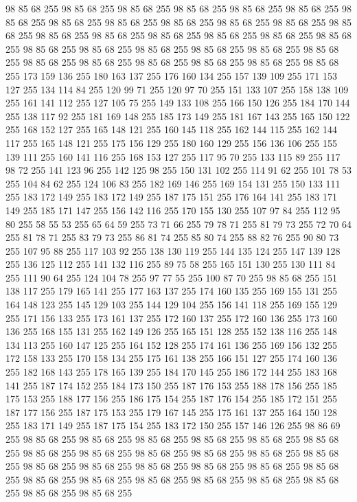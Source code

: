 98 85 68 255 98 85 68 255 98 85 68 255 98 85 68 255 98 85 68 255 98 85 68 255 98 85 68 255 98 85 68 255 98 85 68 255 98 85 68 255 98 85 68 255 98 85 68 255 98 85 68 255 98 85 68 255 98 85 68 255 98 85 68 255 98 85 68 255 98 85 68 255 98 85 68 255 98 85 68 255 98 85 68 255 98 85 68 255 98 85 68 255 98 85 68 255 98 85 68 255 98 85 68 255 98 85 68 255 98 85 68 255 98 85 68 255 98 85 68 255 98 85 68 255 173 159 136 255 180 163 137 255 176 160 134 255 157 139 109 255 171 153 127 255 134 114 84 255 120 99 71 255 120 97 70 255 151 133 107 255 158 138 109 255 161 141 112 255 127 105 75 255 149 133 108 255 166 150 126 255 184 170 144 255 138 117 92 255 181 169 148 255 185 173 149 255 181 167 143 255 165 150 122 255 168 152 127 255 165 148 121 255 160 145 118 255 162 144 115 255 162 144 117 255 165 148 121 255 175 156 129 255 180 160 129 255 156 136 106 255 155 139 111 255 160 141 116 255 168 153 127 255 117 95 70 255
133 115 89 255 117 98 72 255 141 123 96 255 142 125 98 255 150 131 102 255 114 91 62 255 101 78 53 255 104 84 62 255 124 106 83 255 182 169 146 255 169 154 131 255 150 133 111 255 183 172 149 255 183 172 149 255 187 175 151 255 176 164 141 255 183 171 149 255 185 171 147 255 156 142 116 255 170 155 130 255 107 97 84 255 112 95 80 255 58 55 53 255 65 64 59 255 73 71 66 255 79 78 71 255 81 79 73 255 72 70 64 255 81 78 71 255 83 79 73 255 86 81 74 255 85 80 74 255 88 82 76 255 90 80 73 255 107 95 88 255 117 103 92 255 138 130 119 255 144 135 124 255 147 139 128 255 136 125 112 255 141 132 116 255 89 75 58 255 165 151 130 255 130 111 84 255 111 90 64 255 124 104 78 255 97 77 55 255 100 87 70 255 98 85 68 255 151 138 117 255 179 165 141 255 177 163 137 255 174 160 135 255 169 155 131 255 164 148 123 255 145 129 103 255 144 129 104 255 156 141 118 255 169 155 129 255 171 156 133 255 173 161 137 255 172 160 137 255 172 160 136 255 173 160 136 255
168 155 131 255 162 149 126 255 165 151 128 255 152 138 116 255 148 134 113 255 160 147 125 255 164 152 128 255 174 161 136 255 169 156 132 255 172 158 133 255 170 158 134 255 175 161 138 255 166 151 127 255 174 160 136 255 182 168 143 255 178 165 139 255 184 170 145 255 186 172 144 255 183 168 141 255 187 174 152 255 184 173 150 255 187 176 153 255 188 178 156 255 185 175 153 255 188 177 156 255 186 175 154 255 187 176 154 255 185 172 151 255 187 177 156 255 187 175 153 255 179 167 145 255 175 161 137 255 164 150 128 255 183 171 149 255 187 175 154 255 183 172 150 255 157 146 126 255 98 86 69 255 98 85 68 255 98 85 68 255 98 85 68 255 98 85 68 255 98 85 68 255 98 85 68 255 98 85 68 255 98 85 68 255 98 85 68 255 98 85 68 255 98 85 68 255 98 85 68 255 98 85 68 255 98 85 68 255 98 85 68 255 98 85 68 255 98 85 68 255 98 85 68 255 98 85 68 255 98 85 68 255 98 85 68 255 98 85 68 255 98 85 68 255 98 85 68 255 98 85 68 255 98 85 68 255
